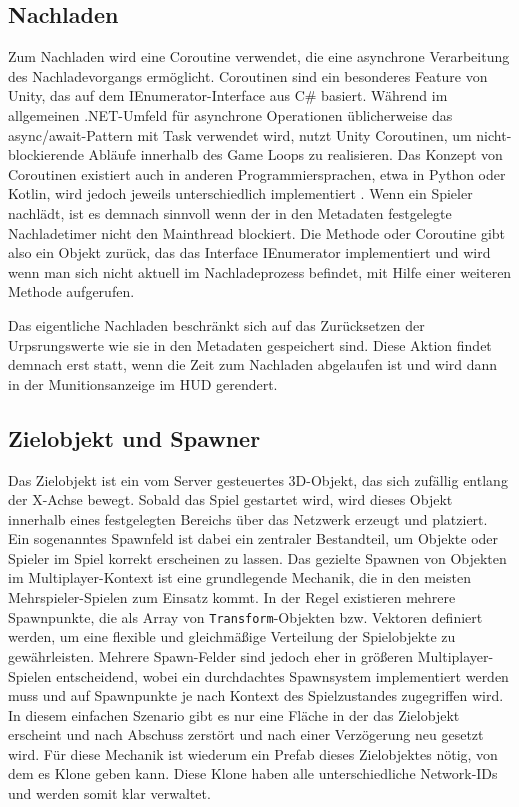 \subsection{Nachladen}
Zum Nachladen wird eine Coroutine verwendet, die eine asynchrone Verarbeitung des Nachladevorgangs ermöglicht. Coroutinen sind ein besonderes Feature von Unity, das auf dem IEnumerator-Interface aus C\# basiert. Während im allgemeinen .NET-Umfeld für asynchrone Operationen üblicherweise das async/await-Pattern mit Task verwendet wird, nutzt Unity Coroutinen, um nicht-blockierende Abläufe innerhalb des Game Loops zu realisieren. Das Konzept von Coroutinen existiert auch in anderen Programmiersprachen, etwa in Python oder Kotlin, wird jedoch jeweils unterschiedlich implementiert \cite{coroutineUnity}.
\newpage
Wenn ein Spieler nachlädt, ist es demnach sinnvoll wenn der in den Metadaten festgelegte Nachladetimer nicht den Mainthread blockiert. Die Methode oder Coroutine gibt also ein Objekt zurück, das das Interface IEnumerator implementiert und wird wenn man sich nicht aktuell im Nachladeprozess befindet, mit Hilfe einer weiteren Methode aufgerufen.

Das eigentliche Nachladen beschränkt sich auf das Zurücksetzen der Urpsrungswerte wie sie in den Metadaten gespeichert sind. Diese Aktion findet demnach erst statt, wenn die Zeit zum Nachladen abgelaufen ist und wird dann in der Munitionsanzeige im HUD gerendert.
\newpage

\subsection{Zielobjekt und Spawner}
\label{Spawner}
Das Zielobjekt ist ein vom Server gesteuertes 3D-Objekt, das sich zufällig entlang der X-Achse bewegt. Sobald das Spiel gestartet wird, wird dieses Objekt innerhalb eines festgelegten Bereichs über das Netzwerk erzeugt und platziert. Ein sogenanntes Spawnfeld ist dabei ein zentraler Bestandteil, um Objekte oder Spieler im Spiel korrekt erscheinen zu lassen. Das gezielte Spawnen von Objekten im Multiplayer-Kontext ist eine grundlegende Mechanik, die in den meisten Mehrspieler-Spielen zum Einsatz kommt. In der Regel existieren mehrere Spawnpunkte, die als Array von \texttt{Transform}-Objekten bzw. Vektoren definiert werden, um eine flexible und gleichmäßige Verteilung der Spielobjekte zu gewährleisten.
Mehrere Spawn-Felder sind jedoch eher in größeren Multiplayer-Spielen entscheidend, wobei ein durchdachtes Spawnsystem implementiert werden muss und auf Spawnpunkte je nach Kontext des Spielzustandes zugegriffen wird. In diesem einfachen Szenario gibt es nur eine Fläche in der das Zielobjekt erscheint und nach Abschuss zerstört und nach einer Verzögerung neu gesetzt wird. Für diese Mechanik ist wiederum ein Prefab dieses Zielobjektes nötig, von dem es Klone geben kann. Diese Klone haben alle unterschiedliche Network-IDs und werden somit klar verwaltet. 

